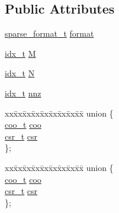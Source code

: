\subsection*{Public Attributes}
\begin{DoxyCompactItemize}
\item 
\hyperlink{spmv_8cc_a8c0094893526c01b430903b2d9227256}{sparse\+\_\+format\+\_\+t} \hyperlink{structsparse__t_a1bb9e61c965f9ea814aab21f7ff77a73}{format}
\item 
\hyperlink{spmv_8cc_a8e93478a00e685bea5e6a3f617bf03a3}{idx\+\_\+t} \hyperlink{structsparse__t_a8a08bd7a16c76180afccf05e28f72a93}{M}
\item 
\hyperlink{spmv_8cc_a8e93478a00e685bea5e6a3f617bf03a3}{idx\+\_\+t} \hyperlink{structsparse__t_a418c6deef17a60f31ff11182ea94f85a}{N}
\item 
\hyperlink{spmv_8cc_a8e93478a00e685bea5e6a3f617bf03a3}{idx\+\_\+t} \hyperlink{structsparse__t_ae982d138f3904323b65975769b045a3f}{nnz}
\item 
\mbox{\label{structsparse__t_a4d180146ce4a12b0d990cf0e803f7e64}} 
\begin{tabbing}
xx\=xx\=xx\=xx\=xx\=xx\=xx\=xx\=xx\=\kill
union \{\\
\>\hyperlink{structcoo__t}{coo\_t} \hyperlink{structsparse__t_ad0391f2782f49ea2eb248ed255e9d732}{coo}\\
\>\hyperlink{structcsr__t}{csr\_t} \hyperlink{structsparse__t_a68a71613181b0380d0d4d871236b2521}{csr}\\
\}; \\

\end{tabbing}\item 
\mbox{\label{structsparse__t_a8b9900b69a370ac69ffadbcae5d635a7}} 
\begin{tabbing}
xx\=xx\=xx\=xx\=xx\=xx\=xx\=xx\=xx\=\kill
union \{\\
\>\hyperlink{structcoo__t}{coo\_t} \hyperlink{structsparse__t_ad0391f2782f49ea2eb248ed255e9d732}{coo}\\
\>\hyperlink{structcsr__t}{csr\_t} \hyperlink{structsparse__t_a68a71613181b0380d0d4d871236b2521}{csr}\\
\}; \\

\end{tabbing}\end{DoxyCompactItemize}


